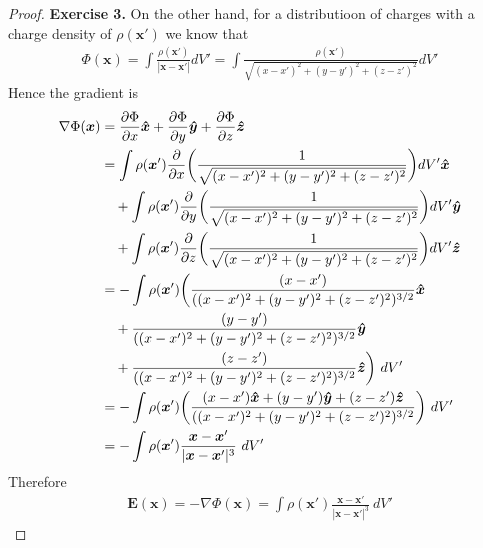 \documentclass[11pt]{article}
\newcommand{\hatx}{\bm{\hat{x}}}
\newcommand{\haty}{\bm{\hat{y}}}
\newcommand{\hatz}{\bm{\hat{z}}}
\newcommand{\vecx}{\bm{x}}
\theoremstyle{definition}
\begin{document}
\begin{proof}{\textbf{Exercise 3.}}
    On the other hand, for a distributioon of charges with a charge density of
    $\rho(\vecx')$ we know that
    \begin{align*}
        \Phi(\vecx) = \int \frac{\rho(\vecx')}{|\vecx - \vecx'|} dV'
        = \int\frac{\rho(\vecx')}{\sqrt{(x -x')^2 + (y -y')^2 + (z -z')^2}} dV'
    \end{align*}
    Hence the gradient is
    \begin{align*}
        \nabla\Phi(\vecx)
        &= \partialderivative{\Phi}{x}\hatx 
        + \partialderivative{\Phi}{y}\haty + \partialderivative{\Phi}{z}\hatz\\
        &= \int\rho(\vecx')
        \partialderivative{}{x}
        \bigg(\frac{1}{\sqrt{(x -x')^2 + (y -y')^2 + (z -z')^2}}\bigg)dV'\hatx\\
        &\quad + \int\rho(\vecx')
        \partialderivative{}{y}
        \bigg(\frac{1}{\sqrt{(x -x')^2 + (y -y')^2 + (z -z')^2}}\bigg)dV'\haty\\
        &\quad + \int\rho(\vecx')
        \partialderivative{}{z}
        \bigg(\frac{1}{\sqrt{(x -x')^2 + (y -y')^2 + (z -z')^2}}\bigg)dV'\hatz\\
        &= -\int\rho(\vecx')
        \bigg(\frac{(x- x')}{((x -x')^2 + (y -y')^2 + (z -z')^2)^{3/2}}\hatx\\
        &\quad+ \frac{(y - y')}{((x -x')^2 + (y -y')^2 + (z -z')^2)^{3/2}}\haty\\
        &\quad+ \frac{(z - z')}{((x -x')^2 + (y -y')^2 + (z -z')^2)^{3/2}}\hatz
        \bigg)~dV'\\
        &= -\int\rho(\vecx')
        \bigg(\frac{(x- x')\hatx + (y - y')\haty + (z -z')\hatz}
        {((x -x')^2 + (y -y')^2 + (z -z')^2)^{3/2}}\bigg)~dV'\\
        &= -\int\rho(\vecx')
        \frac{\vecx - \vecx'}{|\vecx - \vecx'|^3}~dV'
    \end{align*}
    Therefore
    \begin{align*}
        \bm{E}(\vecx) = -\nabla\Phi(\vecx)
        = \int\rho(\vecx') \frac{\vecx - \vecx'}{|\vecx - \vecx'|^3}~dV'
    \end{align*}
\end{proof}
\cleardoublepage
\end{document}
